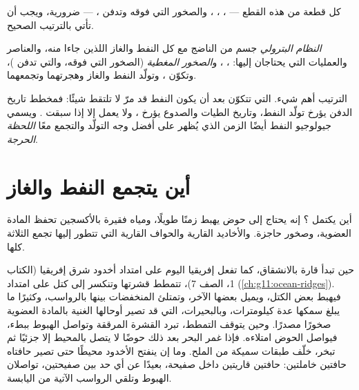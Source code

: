 كل قطعة من هذه القطع --- ، ، ، والصخور التي فوقه
وتدفن ،  --- ضرورية، ويجب أن تأتي
بالترتيب الصحيح.

\begin{definition}\label{def:g11:fossil-fuel-geology:petroleum-system}
\emph{النظام البترولي} جسم من  الناضج
مع كل النفط والغاز اللذين جاءا منه، والعناصر
والعمليات التي يحتاجان إليها: ، ، 
و\emph{الصخور المغطية} (الصخور التي فوقه، والتي تدفن
)، وتكوّن ، وتولّد النفط والغاز وهجرتهما
وتجمعهما.
\end{definition}

الترتيب أهم شيء.  التي تتكوّن بعد أن يكون النفط قد مرّ لا تلتقط
شيئًا: فمخطط تاريخ الدفن يؤرخ تولّد النفط، وتاريخ
الطيات والصدوع يؤرخ ، ولا يعمل  إلا
إذا سبقت . ويسمي جيولوجيو النفط أيضًا الزمن الذي يُظهر على أفضل وجه
التولّد  والتجمع معًا \emph{اللحظة
الحرجة}.

\section{أين يتجمع النفط والغاز}

أين يكتمل ؟ إنه يحتاج إلى حوض يهبط زمنًا
طويلًا، ومياه فقيرة بالأكسجين تحفظ المادة العضوية، وصخور حاجزة. والأخاديد القارية
والحواف القارية التي تتطور إليها تجمع الثلاثة كلها.

حين تبدأ قارة بالانشقاق، كما تفعل إفريقيا اليوم على امتداد أخدود شرق
إفريقيا (الكتاب 1، الصف 7)، تتمطط قشرتها وتنكسر إلى كتل
على امتداد  (\cref{ch:g11:ocean-ridges}). فيهبط بعض الكتل، ويميل
بعضها الآخر، وتمتلئ المنخفضات بينها بالرواسب، وكثيرًا ما يبلغ سمكها عدة
كيلومترات، وبالبحيرات، التي قد تصير أوحالها الغنية بالمادة العضوية
صخورًا مصدرًا. وحين
يتوقف التمطط، تبرد القشرة المرققة وتواصل الهبوط ببطء،
فيواصل الحوض امتلاءه. فإذا غمر البحر بعد ذلك حوضًا لا يتصل بالمحيط إلا
جزئيًا ثم تبخر، خلّف طبقات سميكة من
الملح. وما إن ينفتح الأخدود محيطًا حتى تصير حافتاه حافتين
خاملتين: حافتين قاريتين داخل صفيحة، بعيدًا عن أي حد بين صفيحتين،
تواصلان الهبوط وتلقي الرواسب الآتية من اليابسة.

